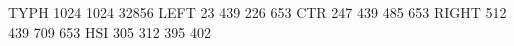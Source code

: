 TYPH 1024 1024 32856
LEFT   23 439 226 653
CTR   247 439 485 653
RIGHT 512 439 709 653
HSI   305 312 395 402
